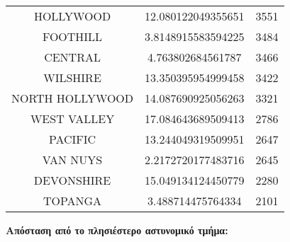 \documentclass{article}
\begin{document}
\begin{center}
\begin{tabular}{|c|c|c|}
HOLLYWOOD & 12.080122049355651 & 3551 \\
FOOTHILL & 3.8148915583594225 & 3484 \\
CENTRAL & 4.763802684561787 & 3466 \\
WILSHIRE & 13.350395954999458 & 3422 \\
NORTH HOLLYWOOD & 14.087690925056263 & 3321 \\
WEST VALLEY & 17.084643689509413 & 2786 \\
PACIFIC & 13.244049319509951 & 2647 \\
VAN NUYS & 2.2172720177483716 & 2645 \\
DEVONSHIRE & 15.049134124450779 & 2280 \\
TOPANGA & 3.488714475764334 & 2101 \\
\hline
\end{tabular}
\end{center}

\vspace{5mm} %

\noindent \textbf{Απόσταση από το πλησιέστερο αστυνομικό τμήμα:}
\end{document}
